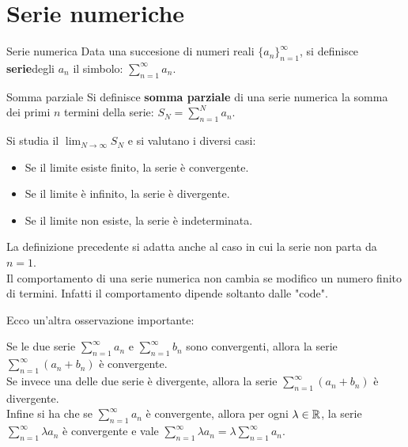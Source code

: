 \chapter{Serie numeriche}

\begin{definizione}{Serie numerica}
  Data una succesione di numeri reali $\{a_n\}_{n=1}^{\infty}$, si definisce \textbf{serie}degli $a_n$ il simbolo: $\sum_{n=1}^{\infty} a_n$.
\end{definizione}

\begin{definizione}{Somma parziale}
  Si definisce \textbf{somma parziale} di una serie numerica la somma dei primi $n$ termini della serie: $S_N = \sum_{n=1}^{N} a_n$.
\end{definizione}

Si studia il $\lim_{N \to \infty} S_N$ e si valutano i diversi casi:
\begin{itemize}
  \item Se il limite esiste finito, la serie è convergente.
  \item Se il limite è infinito, la serie è divergente.
  \item Se il limite non esiste, la serie è indeterminata.
\end{itemize}

\begin{osservazione}{}
  La definizione precedente si adatta anche al caso in cui la serie non parta da $n=1$.\\
  Il comportamento di una serie numerica non cambia se modifico un numero finito di termini. Infatti il comportamento dipende soltanto dalle "code".
\end{osservazione}

Ecco un'altra osservazione importante:
\begin{osservazione}{}
  Se le due serie $\sum_{n=1}^{\infty} a_n$ e $\sum_{n=1}^{\infty} b_n$ sono convergenti, allora la serie $\sum_{n=1}^{\infty} (a_n + b_n)$ è convergente.\\ Se invece una delle due serie è divergente, allora la serie $\sum_{n=1}^{\infty} (a_n + b_n)$ è divergente.\\
  Infine si ha che se $\sum_{n=1}^{\infty} a_n$ è convergente, allora per ogni $\lambda \in \mathbb{R}$, la serie $\sum_{n=1}^{\infty} \lambda a_n$ è convergente e vale $\sum_{n=1}^{\infty} \lambda a_n = \lambda \sum_{n=1}^{\infty} a_n$.
\end{osservazione}

